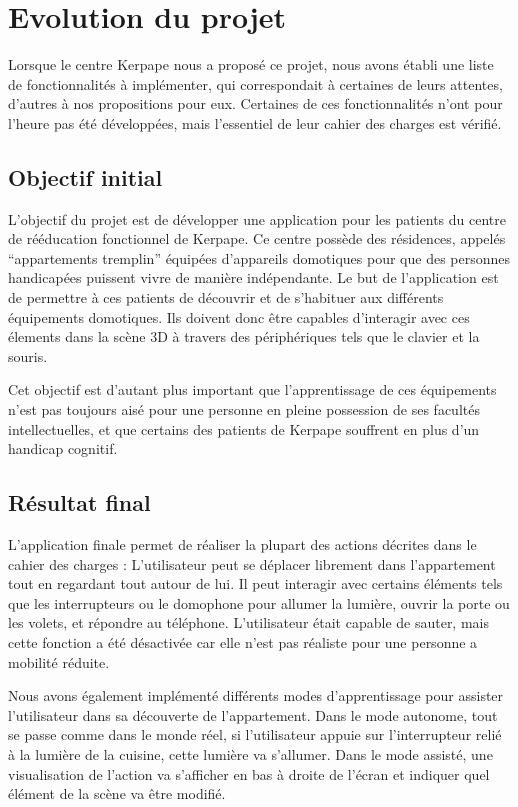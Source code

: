 \section{Evolution du projet}
Lorsque le centre Kerpape nous a proposé ce projet, nous avons établi une liste de fonctionnalités à implémenter, qui correspondait à certaines de leurs attentes, d'autres à nos propositions pour eux.
Certaines de ces fonctionnalités n'ont pour l'heure pas été développées, mais l'essentiel de leur cahier des charges est vérifié.

\subsection{Objectif initial}
L'objectif du projet est de développer une application pour les patients du centre de rééducation fonctionnel de Kerpape. Ce centre possède des résidences, appelés \enquote{appartements tremplin} équipées d'appareils domotiques pour que des personnes handicapées puissent vivre de manière indépendante. Le but de l'application est de permettre à ces patients de découvrir et de s'habituer aux différents équipements domotiques. Ils doivent donc être capables d'interagir avec ces élements dans la scène 3D à travers des périphériques tels que le clavier et la souris.

Cet objectif est d'autant plus important que l'apprentissage de ces équipements n'est pas toujours aisé pour une personne en pleine possession de ses facultés intellectuelles, et que certains des patients de Kerpape souffrent en plus d'un handicap cognitif. 

\subsection{Résultat final}
L'application finale permet de réaliser la plupart des actions décrites dans le cahier des charges : L'utilisateur peut se déplacer librement dans l'appartement tout en regardant tout autour de lui. Il peut interagir avec certains éléments tels que les interrupteurs ou le domophone pour allumer la lumière, ouvrir la porte ou les volets, et répondre au téléphone. L'utilisateur était capable de sauter, mais cette fonction a été désactivée car elle n'est pas réaliste pour une personne a mobilité réduite.

Nous avons également implémenté différents modes d'apprentissage pour assister l'utilisateur dans sa découverte de l'appartement. Dans le mode autonome, tout se passe comme dans le monde réel, si l'utilisateur appuie sur l'interrupteur relié à la lumière de la cuisine, cette lumière va s'allumer. Dans le mode assisté, une visualisation de l'action va s'afficher en bas à droite de l'écran et indiquer quel élément de la scène va être modifié.

